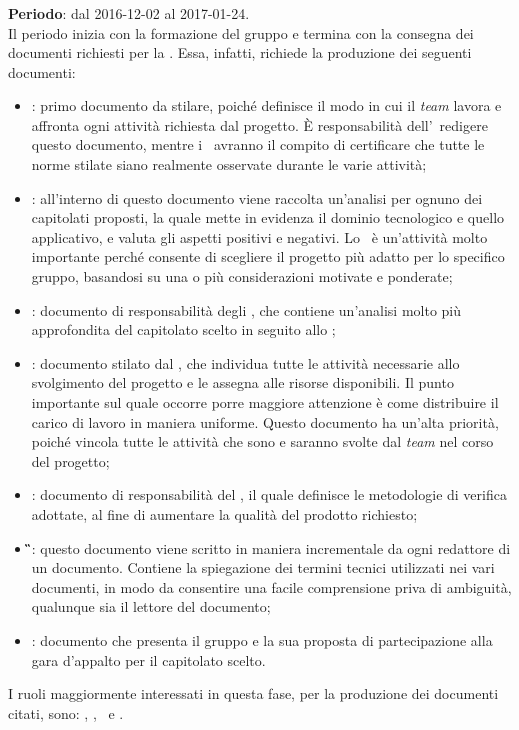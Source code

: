 		\subsubsection{\AR}
		\textbf{Periodo}: dal 2016-12-02 al 2017-01-24.\\
		Il periodo inizia con la formazione del gruppo e termina con la consegna dei documenti richiesti per la \RR. Essa, infatti, richiede la produzione dei seguenti documenti:
		\begin{itemize}
			\item \textbf{\NdP}: primo documento da stilare, poiché definisce il modo in cui il \textit{team} lavora e affronta ogni attività richiesta dal progetto. \MakeUppercase{è} responsabilità dell’\textit{\Amm}\ redigere questo documento, mentre i \textit{\Vers}\ avranno il compito di certificare che tutte le norme stilate siano realmente osservate durante le varie attività;
			\item \textbf{\SdF}: all'interno di questo documento viene raccolta un'analisi per ognuno dei capitolati proposti, la quale mette in evidenza il dominio tecnologico e quello applicativo, e valuta gli aspetti positivi e negativi. Lo \SdF\ è un’attività molto importante perché consente di scegliere il progetto più adatto per lo specifico gruppo, basandosi su una o più considerazioni motivate e ponderate;
			\item \textbf{\AdR}: documento di responsabilità degli \textit{\Anas}, che contiene un’analisi molto più approfondita del capitolato scelto in seguito allo \SdF;
			\item \textbf{\PdP}: documento stilato dal \textit{\RdP}, che individua tutte le attività necessarie allo svolgimento del progetto e le assegna alle risorse disponibili. Il punto importante sul quale occorre porre maggiore attenzione è come distribuire il carico di lavoro in maniera uniforme. Questo documento ha un'alta priorità, poiché vincola tutte le attività che sono e saranno svolte dal \textit{team} nel corso del progetto;
			\item \textbf{\PdQ}: documento di responsabilità del \textit{\Ver}, il quale definisce le metodologie di verifica adottate, al fine di aumentare la qualità del prodotto richiesto;
			\item \textbf{\G}: questo documento viene scritto in maniera incrementale da ogni redattore di un documento. Contiene la spiegazione dei termini tecnici utilizzati nei vari documenti, in modo da consentire una facile comprensione priva di ambiguità, qualunque sia il lettore del documento;
			\item \textbf{\LdP}: documento che presenta il gruppo e la sua proposta di partecipazione alla gara d’appalto per il capitolato scelto.
		\end{itemize}
		I ruoli maggiormente interessati in questa fase, per la produzione dei documenti citati, sono: \textit{\Amm}, \textit{\Res}, \textit{\Ana}\ e \textit{\Ver}.
		
